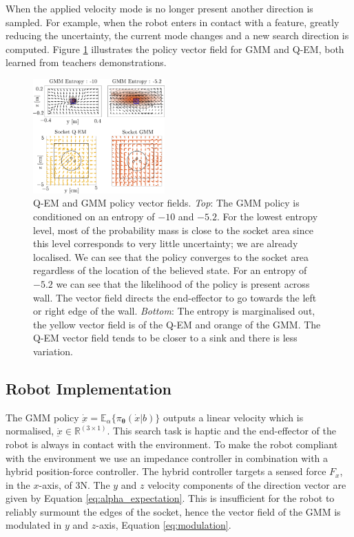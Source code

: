 \documentclass[final,5p,times,twocolumn]{elsarticle}
\newcommand{\Param}{\boldsymbol{\theta}}
\begin{document}
When the applied velocity mode is no longer present another direction is sampled. For example, when the robot enters in contact 
with a feature, greatly reducing the uncertainty, the current mode changes and a new search direction is computed. 
Figure \ref{fig:policy_vf} illustrates the policy vector field for GMM and Q-EM, both learned from teachers demonstrations.

\begin{figure}
   \includegraphics[width=0.45\textwidth]{./Figures/Fig/policy_vf.pdf}
  \caption{Q-EM and GMM policy vector fields. \textit{Top}: The GMM policy is conditioned on an entropy of $-10$ and $-5.2$. For the lowest entropy level,
  most of the probability mass is close to the socket area since this level corresponds to very little uncertainty; we are already localised. We can see 
  that the policy converges to the socket area regardless of the location of the believed state. For an entropy of $-5.2$ we can see that 
  the likelihood of the policy is present across wall. The vector field directs the end-effector to go towards the left or right edge of the wall. 
  \textit{Bottom}: The entropy is marginalised out, the yellow vector field is of the Q-EM and orange of the GMM. The Q-EM vector field tends 
  to be closer to a sink and there is less variation.}
  \label{fig:policy_vf}
\end{figure}
 

\subsection{Robot Implementation}

The GMM policy $\dot{\underbar{x}} = \mathbb{E}_{\alpha}\{\pi_{\Param}(\dot{x}|b)\}$ outputs a linear velocity which 
is normalised, $\dot{\underbar{x}} \in \mathbb{R}^{(3 \times 1)}$.
This search task is haptic and the end-effector of the robot is always in contact with the environment. To make the robot
compliant with the environment we use an impedance controller in combination with a hybrid position-force controller. The hybrid controller
targets a sensed force $F_x$, in the $x$-axis, of 3N. The $y$ and $z$ velocity components of the direction vector are given by 
Equation \ref{eq:alpha_expectation}. This is insufficient for the robot to reliably surmount the edges of the socket,
hence the vector field of the GMM is modulated in $y$ and $z$-axis, Equation \ref{eq:modulation}.
\end{document}
